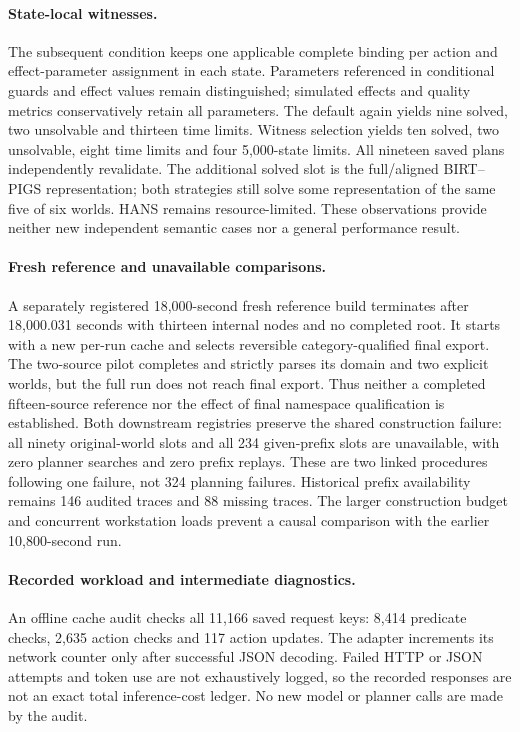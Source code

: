 \documentclass[letterpaper]{article}
\begin{document}
\paragraph{State-local witnesses.}
The subsequent condition keeps one applicable complete binding per action and effect-parameter assignment in each state. Parameters referenced in conditional guards and effect values remain distinguished; simulated effects and quality metrics conservatively retain all parameters. The default again yields nine solved, two unsolvable and thirteen time limits. Witness selection yields ten solved, two unsolvable, eight time limits and four 5,000-state limits. All nineteen saved plans independently revalidate. The additional solved slot is the full/aligned BIRT--PIGS representation; both strategies still solve some representation of the same five of six worlds. HANS remains resource-limited. These observations provide neither new independent semantic cases nor a general performance result.


\paragraph{Fresh reference and unavailable comparisons.}
A separately registered 18,000-second fresh reference build terminates after 18,000.031 seconds with thirteen internal nodes and no completed root. It starts with a new per-run cache and selects reversible category-qualified final export. The two-source pilot completes and strictly parses its domain and two explicit worlds, but the full run does not reach final export. Thus neither a completed fifteen-source reference nor the effect of final namespace qualification is established. Both downstream registries preserve the shared construction failure: all ninety original-world slots and all 234 given-prefix slots are unavailable, with zero planner searches and zero prefix replays. These are two linked procedures following one failure, not 324 planning failures. Historical prefix availability remains 146 audited traces and 88 missing traces. The larger construction budget and concurrent workstation loads prevent a causal comparison with the earlier 10,800-second run.


\paragraph{Recorded workload and intermediate diagnostics.}
An offline cache audit checks all 11,166 saved request keys: 8,414 predicate checks, 2,635 action checks and 117 action updates. The adapter increments its network counter only after successful JSON decoding. Failed HTTP or JSON attempts and token use are not exhaustively logged, so the recorded responses are not an exact total inference-cost ledger. No new model or planner calls are made by the audit.
\end{document}
